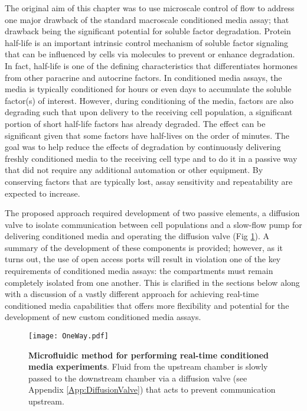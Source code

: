 The original aim of this chapter was to use microscale control of flow to address one major drawback of the standard macroscale conditioned media assay; that drawback being the significant potential for soluble factor degradation. Protein half-life is an important intrinsic control mechanism of soluble factor signaling that can be influenced by cells via molecules to prevent or enhance degradation. In fact, half-life is one of the defining characteristics that differentiates hormones from other paracrine and autocrine factors. In conditioned media assays, the media is typically conditioned for hours or even days to accumulate the soluble factor(s) of interest. However, during conditioning of the media, factors are also degrading such that upon delivery to the receiving cell population, a significant portion of short half-life factors has already degraded. The effect can be significant given that some factors have half-lives on the order of minutes. The goal was to help reduce the effects of degradation by continuously delivering freshly conditioned media to the receiving cell type and to do it in a passive way that did not require any additional automation or other equipment. By conserving factors that are typically lost, assay sensitivity and repeatability are expected to increase.

The proposed approach required development of two passive elements, a diffusion valve to isolate communication between cell populations and a slow-flow pump for delivering conditioned media and operating the diffusion valve (Fig \ref{Chap:RealTimeCM:fig:oneWay}). A summary of the development of these components is provided; however, as it turns out, the use of open access ports will result in violation one of the key requirements of conditioned media assays: the compartments must remain completely isolated from one another. This is clarified in the sections below along with a discussion of a vastly different approach for achieving real-time conditioned media capabilities that offers more flexibility and potential for the development of new custom conditioned media assays.

\begin{figure}[!ht]
\centering
\texttt{[image: OneWay.pdf]}
\caption{\textbf{Microfluidic method for performing real-time conditioned media experiments}. Fluid from the upstream chamber is slowly passed to the downstream chamber via a diffusion valve (see Appendix \ref{App:DiffusionValve}) that acts to prevent communication upstream.}
\label{Chap:RealTimeCM:fig:oneWay}
\end{figure}

